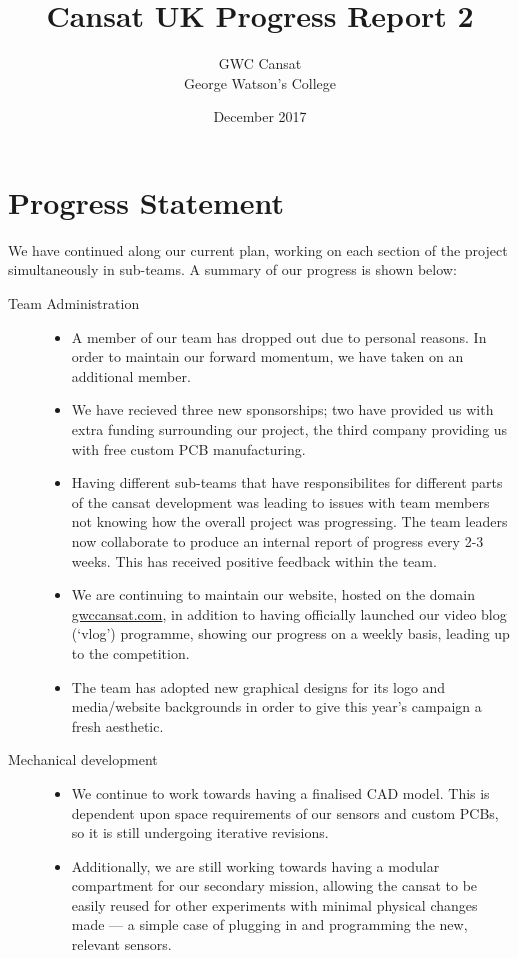 \documentclass{report}
\title{\bf Cansat UK Progress Report 2}
\author{
	GWC Cansat\\
	George Watson's College	
}
\date{December 2017}
\begin{document}
\maketitle
\tableofcontents
{}

\chapter{Progress Statement}
	We have continued along our current plan, working on each 
	section of the project simultaneously in sub-teams. A summary 
	of our progress is shown below:

	\begin{description}
		\item[Team Administration] \hfill \begin{itemize}
			\item A member of our team has dropped out due to personal
			reasons. In order to maintain our forward momentum, we
			have taken on an additional member.
			\item We have recieved three new sponsorships; two have 
			provided us with extra funding surrounding our project,
			the third company providing us with free custom PCB 
			manufacturing.
			\item Having different sub-teams that have responsibilites for
			different	parts of the cansat development was leading to issues
			with team members not knowing how the overall	project was 
			progressing. The team leaders now collaborate to produce an
			internal report of progress every 2-3 weeks. This has received
			positive feedback within the team.
			\item We are continuing to maintain our website, hosted on the
			domain \url{gwccansat.com}, in addition to having officially launched our
			video blog (`vlog') programme, showing our progress on a weekly
			basis, leading up to the competition.
			\item The team has adopted new graphical designs for its logo and
			media/website backgrounds in order to give this year's campaign a fresh
			aesthetic.
		\end{itemize}
		
		\item[Mechanical development] \hfill \begin{itemize}
			\item We continue to work towards having a finalised 
			CAD model. This is dependent upon space requirements of
			our sensors and custom PCBs, so it is still undergoing iterative
			revisions.
			\item Additionally, we are still working towards having a modular
			compartment for our secondary mission, allowing the cansat to
			be easily reused for other experiments with minimal physical
			changes made --- a simple case of plugging in and programming
			the new, relevant sensors.
		\end{itemize}


\end{description}
\end{document}
